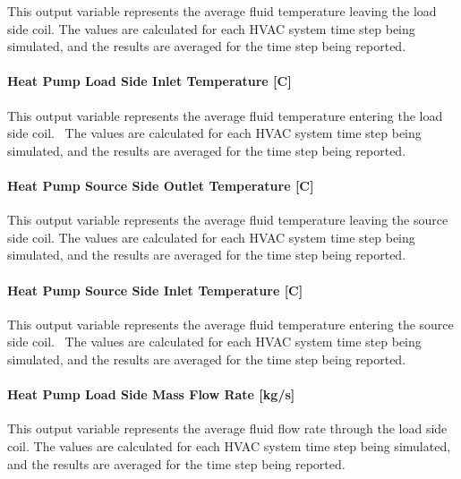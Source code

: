 This output variable represents the average fluid temperature leaving the load side coil. The values are calculated for each HVAC system time step being simulated, and the results are averaged for the time step being reported.

\paragraph{Heat Pump Load Side Inlet Temperature {[}C{]}}\label{water-to-water-heat-pump-load-side-inlet-temperature-c}

This output variable represents the average fluid temperature entering the load side coil.~ The values are calculated for each HVAC system time step being simulated, and the results are averaged for the time step being reported.

\paragraph{Heat Pump Source Side Outlet Temperature {[}C{]}}\label{water-to-water-heat-pump-source-side-outlet-temperature-c}

This output variable represents the average fluid temperature leaving the source side coil. The values are calculated for each HVAC system time step being simulated, and the results are averaged for the time step being reported.

\paragraph{Heat Pump Source Side Inlet Temperature {[}C{]}}\label{water-to-water-heat-pump-source-side-inlet-temperature-c}

This output variable represents the average fluid temperature entering the source side coil.~ The values are calculated for each HVAC system time step being simulated, and the results are averaged for the time step being reported.

\paragraph{Heat Pump Load Side Mass Flow Rate {[}kg/s{]}}\label{water-to-water-heat-pump-load-side-mass-flow-rate-kgs}

This output variable represents the average fluid flow rate through the load side coil. The values are calculated for each HVAC system time step being simulated, and the results are averaged for the time step being reported.

